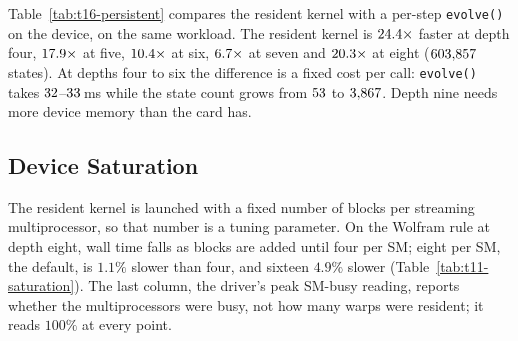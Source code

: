 Table~\ref{tab:t16-persistent} compares the resident kernel with a per-step \texttt{evolve()} on the
device, on the same workload. The resident kernel is $24.4\times$ faster at depth
four, $17.9\times$ at five, $10.4\times$ at six,
$6.7\times$ at seven and $20.3\times$ at eight
($603{,}857$ states). At depths four to six the difference is a fixed cost per call:
\texttt{evolve()} takes $32$--$33$\,ms while the state
count grows from $53$ to $3{,}867$. Depth nine needs more device
memory than the card has.

\begin{table}[htbp]
\centering
\caption{End-to-end evolution time by depth on the Wolfram rule: GPU against CPU
at one and at eight threads.}
\label{tab:t7-gpu}

\end{table}

\begin{table}[tb]
\centering
\caption{GPU against CPU across the corpus, one row per workload at its standard depth: the single
rules, the rule combinations, and the large symmetric states. Both engines run the same rules,
initial states, canonicalization mode and exploration strategy; medians share one session and one
iteration count.}
\label{tab:t7b-gpu-corpus}

\end{table}

\begin{table}[htbp]
\centering
\caption{The resident kernel against a per-step \texttt{evolve()}, both on the
device, by depth on the same rule and initial state.}
\label{tab:t16-persistent}

\end{table}

\subsection{Device Saturation}
The resident kernel is launched with a fixed number of blocks per streaming multiprocessor, so that
number is a tuning parameter. On the Wolfram rule at depth eight, wall time falls as blocks are
added until four per SM; eight per SM, the default, is $1.1\%$ slower than four, and sixteen
$4.9\%$ slower (Table~\ref{tab:t11-saturation}). The
last column, the driver's peak SM-busy reading, reports whether the multiprocessors were busy, not
how many warps were resident; it reads $100\%$ at every point.

